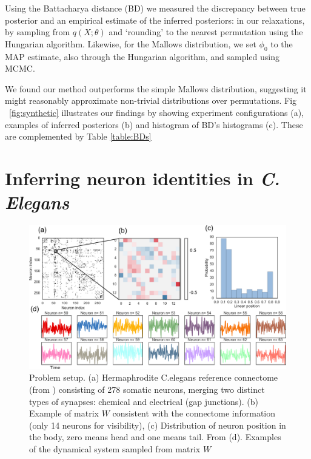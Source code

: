 \documentclass[twoside]{article}
\begin{document}
 Using the Battacharya distance (BD) we measured the discrepancy
 between true posterior and an empirical estimate of the inferred
 posteriors: in our relaxations, by sampling from $q(X; \theta)$ and `rounding'
 to the nearest permutation using the Hungarian algorithm. Likewise, for the Mallows distribution, we set $\phi_0$ to the MAP estimate, also through the Hungarian algorithm, and sampled using MCMC.
 
 We found our method outperforms the simple Mallows distribution, suggesting it might reasonably approximate non-trivial distributions over permutations. Fig ~\ref{fig:synthetic} illustrates our findings by showing experiment configurations (a), examples of inferred posteriors (b) and histogram of BD's histograms (c). These are complemented by Table \ref{table:BDs}


\section{Inferring neuron identities in \textit{C. Elegans}}
\label{sec:celegans}

\begin{figure}[ht]
  \centering
  \includegraphics[width=1.0\textwidth]{../figures/figure6.pdf} 
  \caption{Problem setup. (a) Hermaphrodite C.elegans reference
    connectome (from \cite{varshney2011structural,wormatlas})
    consisting of 278 somatic neurons, merging two distinct types of
    synapses: chemical and electrical (gap junctions). (b) Example of
    matrix $W$ consistent with the connectome information (only 14
    neurons for visibility), (c) Distribution of neuron position in
    the body, zero means head and one means tail. From
    \cite{white1986structure,wormatlas} (d). Examples of the dynamical
    system sampled from matrix $W$}
  \label{fig:connectome}
\end{figure}
\end{document}

